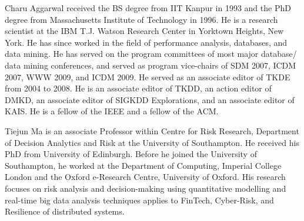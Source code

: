 \begin{IEEEbiography}{Charu Aggarwal} received the BS degree
from IIT Kanpur in 1993 and the PhD degree
from Massachusetts Institute of Technology in
1996. He is a research scientist at the IBM T.J.
Watson Research Center in Yorktown Heights,
New York. He has since worked in the field of
performance analysis, databases, and data mining.
He has served on the
program committees of most major database/
data mining conferences, and served as program vice-chairs of SDM 2007, ICDM 2007, WWW 2009, and ICDM
2009. He served as an associate editor of TKDE from 2004 to 2008. He is an
associate editor of TKDD, an action editor of DMKD, an associate editor of SIGKDD Explorations, and an associate editor of KAIS. He is a fellow of the IEEE and a fellow of the ACM.
\end{IEEEbiography}
\vspace{-8ex}
\begin{IEEEbiography}{Tiejun Ma} is an associate Professor within Centre for Risk Research, Department of Decision Analytics and Risk at the University of Southampton. He received his PhD from University of Edinburgh. Before he joined the University of Southampton, he worked at the Department of Computing, Imperial College London and the Oxford e-Research Centre, University of Oxford. His research focuses on risk analysis and decision-making using quantitative modelling and real-time big data analysis techniques applies to FinTech, Cyber-Risk, and Resilience of distributed systems.
\end{IEEEbiography}
\vspace{-8ex}
